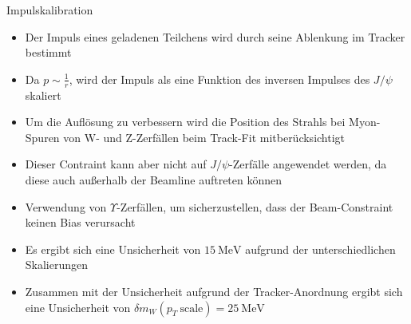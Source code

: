 \documentclass[aspectratio=1610, 9pt]{beamer}
\begin{document}
\begin{frame}{Impulskalibration}
  \begin{itemize}
    \item Der Impuls eines geladenen Teilchens wird durch seine Ablenkung im Tracker bestimmt
    \item Da $p \sim \frac{1}{r}$, wird der Impuls als eine Funktion des inversen Impulses des $J/\psi$ skaliert
    \item Um die Auflösung zu verbessern wird die Position des Strahls bei Myon-Spuren von W- und Z-Zerfällen beim Track-Fit mitberücksichtigt
  \end{itemize}
\end{frame}

\begin{frame}
  \begin{itemize}
    \item Dieser Contraint kann aber nicht auf $J/\psi$-Zerfälle angewendet werden, da diese auch außerhalb der Beamline auftreten können
    \item[\rightarrow] Verwendung von $\Upsilon$-Zerfällen, um sicherzustellen, dass der Beam-Constraint keinen Bias verursacht
    \item Es ergibt sich eine Unsicherheit von $\SI{15}{\MeV}$ aufgrund der unterschiedlichen Skalierungen
    \item Zusammen mit der Unsicherheit aufgrund der Tracker-Anordnung ergibt sich eine Unsicherheit von $\delta m_W (p_T \: \text{scale}) = \SI{25}{\MeV}$
  \end{itemize}
\end{frame}
\end{document}
